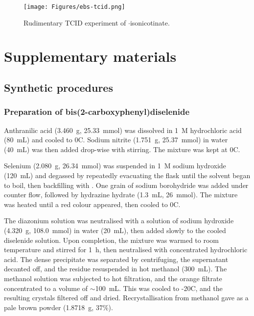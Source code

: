 \begin{figure}
    \centering
    \texttt{[image: Figures/ebs-tcid.png]}
    \caption[TCID experiment of $\cdot$isonicotinate]{Rudimentary TCID experiment of $\cdot$isonicotinate.}
    \label{fig:ebs-tcid}
\end{figure}

\section{Supplementary materials}


\subsection{Synthetic procedures}

\subsubsection[Preparation of \refcmpd{diselenide}]{Preparation of bis(2-carboxyphenyl)diselenide }
\label{sec:diselenide_prep}
Anthranilic acid (3.460~g, 25.33~mmol) was dissolved in 1~\textsc{M} hydrochloric acid (80~mL) and cooled to 0\degree C.
Sodium nitrite (1.751~g, 25.37~mmol) in water (40~mL) was then added drop-wise with stirring.
The mixture was kept at 0\degree C.

Selenium (2.080~g, 26.34~mmol) was suspended in 1~\textsc{M} sodium hydroxide (120~mL) and degassed by repeatedly evacuating the flask until the solvent began to boil, then backfilling with .
One grain of sodium borohydride was added under  counter flow, followed by hydrazine hydrate (1.3~mL, 26~mmol).
The mixture was heated until a red colour appeared, then cooled to 0\degree C.

The diazonium solution was neutralised with a solution of sodium hydroxide (4.320~g, 108.0~mmol) in water (20~mL), then added slowly to the cooled diselenide solution.
Upon completion, the mixture was warmed to room temperature and stirred for 1~h, then neutralised with concentrated hydrochloric acid.
The dense precipitate was separated by centrifuging, the supernatant decanted off, and the residue resuspended in hot methanol (300~mL).
The methanol solution was subjected to hot filtration, and the orange filtrate concentrated to a volume of $\sim$100~mL.
This was cooled to -20\degree C, and the resulting crystals filtered off and dried.
Recrystallisation from methanol gave  as a pale brown powder (1.8718~g, 37\%).


